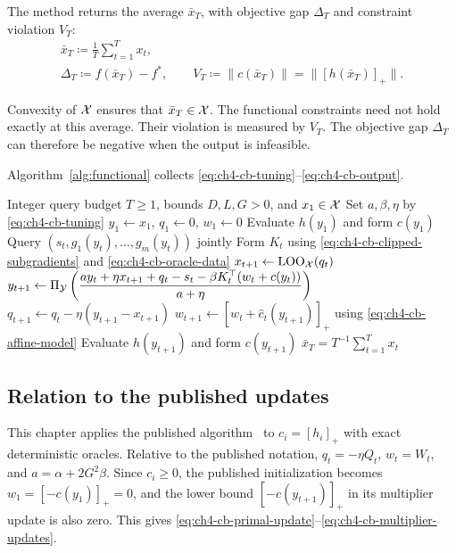 The method returns the average $\bar x_T$, with objective gap $\Delta_T$
and constraint violation $V_T$:
\begin{equation}\label{eq:ch4-cb-output}
\begin{gathered}
\bar x_T\coloneqq\frac1T\sum_{t=1}^Tx_t,\\
\Delta_T\coloneqq f(\bar x_T)-f^*,\qquad
V_T\coloneqq\|c(\bar x_T)\|=\|[h(\bar x_T)]_+\|.
\end{gathered}
\end{equation}

Convexity of $\mathcal{X}$ ensures that $\bar x_T\in\mathcal{X}$. The functional
constraints need not hold exactly at this average. Their violation is
measured by $V_T$. The objective gap $\Delta_T$ can therefore be negative
when the output is infeasible.

Algorithm~\ref{alg:functional} collects
\eqref{eq:ch4-cb-tuning}--\eqref{eq:ch4-cb-output}.
\begin{algorithm}[H]
\caption{Projection-free method with functional constraints}
\label{alg:functional}
\begin{algorithmic}[1]
\Require Integer query budget $T\ge1$, bounds $D,L,G>0$, and $x_1\in\mathcal{X}$
\State Set $a,\beta,\eta$ by \eqref{eq:ch4-cb-tuning}
\State $y_1\gets x_1$, $q_1\gets0$, $w_1\gets0$
\State Evaluate $h(y_1)$ and form $c(y_1)$
    \State Query $(s_t,g_1(y_t),\ldots,g_m(y_t))$ jointly
    \State Form $K_t$ using \eqref{eq:ch4-cb-clipped-subgradients} and \eqref{eq:ch4-cb-oracle-data}
    \State $x_{t+1}\gets\operatorname{LOO}_{\mathcal{X}}(q_t)$
    \State $\displaystyle y_{t+1}\gets\Pi_{\mathcal{Y}}\left(
    \frac{a y_t+\eta x_{t+1}+q_t-s_t-\beta K_t^\top(w_t+c(y_t))}{a+\eta}\right)$
    \State $q_{t+1}\gets q_t-\eta(y_{t+1}-x_{t+1})$
    \State $w_{t+1}\gets[w_t+\widehat c_t(y_{t+1})]_+$ using \eqref{eq:ch4-cb-affine-model}
    \State Evaluate $h(y_{t+1})$ and form $c(y_{t+1})$
\EndFor
\State \Return $\displaystyle\bar x_T=T^{-1}\sum_{t=1}^T x_t$
\end{algorithmic}
\end{algorithm}

\subsection{Relation to the published updates}
\label{sec:ch4-published-updates}

This chapter applies the published algorithm~\cite{asgari2024nonsmooth}
to $c_i=[h_i]_+$ with exact deterministic oracles.
Relative to the published notation, $q_t=-\eta Q_t$, $w_t=W_t$, and
$a=\alpha+2G^2\beta$. Since $c_i\ge0$, the published initialization
becomes $w_1=[-c(y_1)]_+=0$, and the lower bound
$[-c(y_{t+1})]_+$ in its multiplier update is also zero. This gives
\eqref{eq:ch4-cb-primal-update}--\eqref{eq:ch4-cb-multiplier-updates}.

